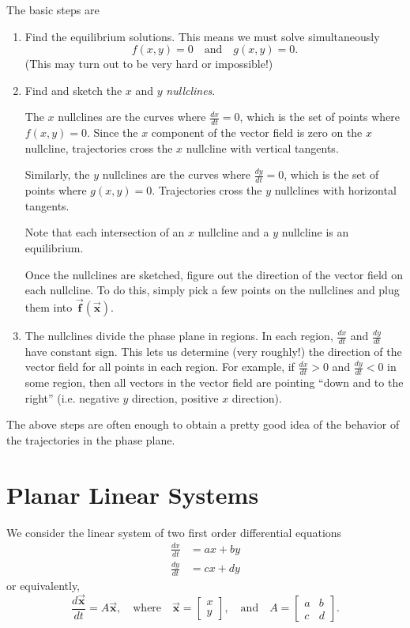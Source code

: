 \documentclass[reqno]{immbook}
\newcommand{\BF}{\vec{\textbf{f}}}
\newcommand{\BX}{\vec{\textbf{x}}}
\begin{document}
The basic steps are
\begin{enumerate}
\item Find the equilibrium solutions.
This means we must solve simultaneously
\begin{equation}
    f(x,y) = 0 \quad \textrm{and} \quad g(x,y) =0.
\end{equation}
(This may turn out to be very hard or impossible!)
\item Find and sketch the $x$ and $y$ \emph{nullclines}.

The $x$ nullclines are the curves where $\frac{dx}{dt}=0$, which
is the set of points where $f(x,y)=0$.
Since the $x$ component of the vector field is zero on the
$x$ nullcline, trajectories cross the $x$ nullcline with
vertical tangents.

Similarly, the $y$ nullclines are the curves where
$\frac{dy}{dt} = 0$, which is the set of points where $g(x,y) = 0$.
Trajectories cross the $y$ nullclines with horizontal tangents.

Note that each intersection of an $x$ nullcline and a $y$ nullcline
is an equilibrium.

Once the nullclines are sketched, figure out the direction of the
vector field on each nullcline. To do this, simply pick a few points
on the nullclines and plug them into $\BF(\BX)$.

\item
The nullclines divide the phase plane in regions.  In each
region, $\frac{dx}{dt}$ and $\frac{dy}{dt}$ have constant sign.
This lets us determine (very roughly!) the direction of the
vector field for all points in each region.  For example,
if $\frac{dx}{dt} > 0$ and $\frac{dy}{dt} < 0$ in some region,
then all vectors in the vector field are pointing
``down and to the right'' (i.e. negative $y$ direction,
positive $x$ direction).
\end{enumerate}
The above steps are often enough to obtain a
pretty good idea of the behavior of the trajectories
in the phase plane.


\section{Planar Linear Systems}


We consider the linear system of two first order
differential equations
\begin{equation}
\begin{split}
  \frac{dx}{dt} & = ax + by \\
  \frac{dy}{dt} & = cx + dy
\end{split}
\end{equation}
or equivalently,
\begin{equation}
  \frac{d\BX}{dt} = A\BX, \quad \textrm{where} \quad
     \BX = \begin{bmatrix} x \\ y \end{bmatrix},
     \quad \textrm{and} \quad
     A = \begin{bmatrix} a & b \\ c & d \end{bmatrix}.
\label{eqn:linearsys}
\end{equation}
\end{document}
